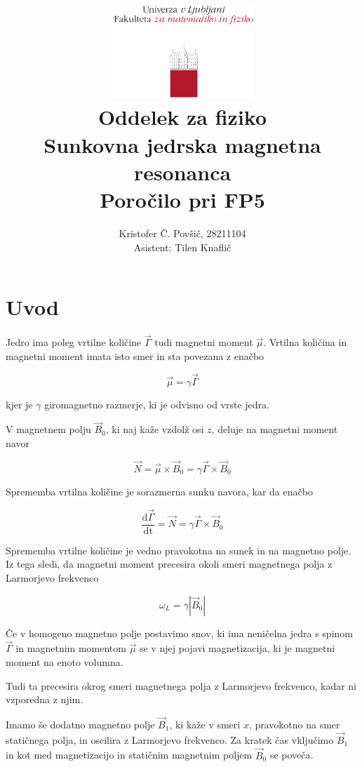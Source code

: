 \documentclass[11pt]{article}
\title{
  \includegraphics[width=0.4\textwidth]{fmf_logo}\\
  {\small Oddelek za fiziko} \\
  {Sunkovna jedrska magnetna resonanca}\\
  {\small Poročilo pri FP5}\\

}
\date{}
\author{ Kristofer Č. Povšič, 28211104 \\[5 cm]
 \small  Asistent: Tilen Knaflič \\
}
\begin{document}
\maketitle
\newpage
\tableofcontents
\newpage

\section{Uvod}\label{sec:orgf006394}

Jedro ima poleg vrtilne količine \(\vec{\Gamma}\) tudi magnetni moment \(\vec{\mu}\). Vrtilna količina in magnetni moment imata isto smer in sta povezana z enačbo

\begin{equation}
\label{eq:1}
\vec{\mu} = \gamma \vec{\Gamma}
\end{equation}

kjer je \(\gamma\) giromagnetno razmerje, ki je odvisno od vrste jedra.

V magnetnem polju \(\vec{B}_0\), ki naj kaže vzdolž osi \(z\), deluje na magnetni moment navor

\begin{equation}
\label{eq:2}
\vec{N} = \vec{\mu} \times \vec{B}_0 = \gamma \vec{\Gamma} \times \vec{B}_0
\end{equation}

Sprememba vrtilna količine je sorazmerna sunku navora, kar da enačbo

\begin{equation}
\label{eq:3}
\frac{\mathrm{d} \vec{\Gamma}}{\mathrm{dt}} = \vec{N} = \gamma \vec{\Gamma} \times \vec{B}_0
\end{equation}

Sprememba vrtilne količine je vedno pravokotna na sunek in na magnetno polje. Iz tega sledi, da magnetni moment precesira okoli smeri magnetnega polja z Larmorjevo frekvenco

\begin{equation}
\label{eq:4}
\omega_L = \gamma \left| \vec{B}_0 \right|
\end{equation}

Če v homogeno magnetno polje postavimo snov, ki ima neničelna jedra s spinom \(\vec{\Gamma}\) in magnetnim momentom \(\vec{\mu}\) se v njej pojavi magnetizacija, ki je magnetni moment na enoto volumna.

Tudi ta precesira okrog smeri magnetnega polja z Larmorjevo frekvenco, kadar ni vzporedna z njim.

Imamo še dodatno magnetno polje \(\vec{B}_1\), ki kaže v smeri \(x\), pravokotno na smer statičnega polja, in oscilira z Larmorjevo frekvenco. Za kratek čas vključimo \(\vec{B}_1\) in kot med magnetizacijo in statičnim magnetnim poljem \(\vec{B}_0\) se poveča.
\end{document}
